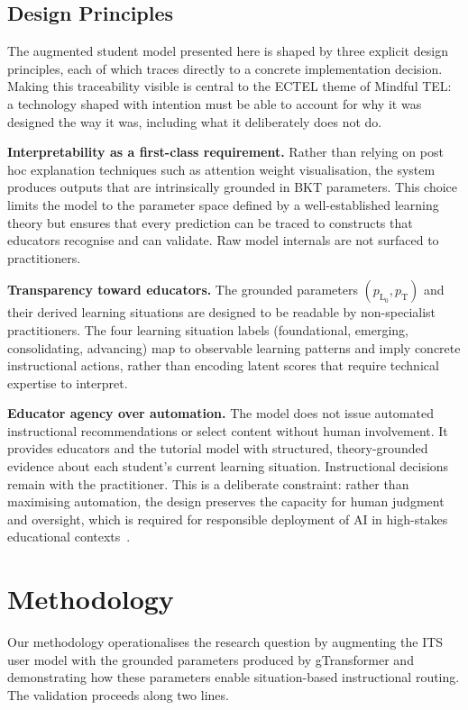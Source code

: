 \documentclass[runningheads]{llncs}
\begin{document}
\subsection{Design Principles}

The augmented student model presented here is shaped by three explicit design principles, each of which traces directly to a concrete implementation decision. Making this traceability visible is central to the ECTEL theme of Mindful TEL: a technology shaped with intention must be able to account for why it was designed the way it was, including what it deliberately does not do.

\textbf{Interpretability as a first-class requirement.} Rather than relying on post hoc explanation techniques such as attention weight visualisation, the system produces outputs that are intrinsically grounded in BKT parameters. This choice limits the model to the parameter space defined by a well-established learning theory but ensures that every prediction can be traced to constructs that educators recognise and can validate. Raw model internals are not surfaced to practitioners.

\textbf{Transparency toward educators.} The grounded parameters $(p_{\text{L}_0}, p_{\text{T}})$ and their derived learning situations are designed to be readable by non-specialist practitioners. The four learning situation labels (foundational, emerging, consolidating, advancing) map to observable learning patterns and imply concrete instructional actions, rather than encoding latent scores that require technical expertise to interpret.

\textbf{Educator agency over automation.} The model does not issue automated instructional recommendations or select content without human involvement. It provides educators and the tutorial model with structured, theory-grounded evidence about each student's current learning situation. Instructional decisions remain with the practitioner. This is a deliberate constraint: rather than maximising automation, the design preserves the capacity for human judgment and oversight, which is required for responsible deployment of AI in high-stakes educational contexts~\cite{Holmes2022504}.

%
\section{Methodology}

Our methodology operationalises the research question by augmenting the ITS user model with the grounded parameters produced by gTransformer and demonstrating how these parameters enable situation-based instructional routing. The validation proceeds along two lines.
\end{document}
